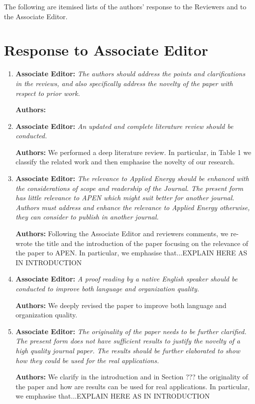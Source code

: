 \documentclass{article}
\begin{document}
The following are itemised lists of the authors' response to the Reviewers and to the Associate Editor.



\section{Response to Associate Editor}



\begin{enumerate}

	\item \textbf{Associate Editor:} \textit{The authors should address the points and clarifications in the reviews, and also specifically address the novelty of the paper with respect to prior work.}
	
	\textbf{Authors:}
	
	\item \textbf{Associate Editor:} \textit{An updated and complete literature review should be conducted.}
		
	\textbf{Authors:} We performed a deep literature review. In particular, in Table 1 we classify the related work and then emphasise the novelty of our research.

	\item \textbf{Associate Editor:} \textit{The relevance to Applied Energy should be enhanced with the considerations of scope and readership of the Journal.  The present form has little relevance to APEN which might suit better for another journal. Authors must address and enhance the relevance to Applied Energy otherwise, they can consider to publish in another journal.}
	
	\textbf{Authors:} Following the Associate Editor and reviewers comments, we re-wrote the title and the introduction of the paper focusing on the relevance of the paper to APEN. In particular, we emphasise that...EXPLAIN HERE AS IN INTRODUCTION

	\item \textbf{Associate Editor:} \textit{A proof reading by a native English speaker should be conducted to improve both language and organization quality. }

	\textbf{Authors:} We deeply revised the paper to improve both language and organization quality.

	\item \textbf{Associate Editor:} \textit{The originality of the paper needs to be further clarified. The present form does not have sufficient results to justify the novelty of a high quality journal paper. The results should be further elaborated to show how they could be used for the real applications.}

	\textbf{Authors:} We clarify in the introduction and in Section ??? the originality of the paper and how are results can be used for real applications. In particular, we emphasise that...EXPLAIN HERE AS IN INTRODUCTION

\end{enumerate}
\end{document}
